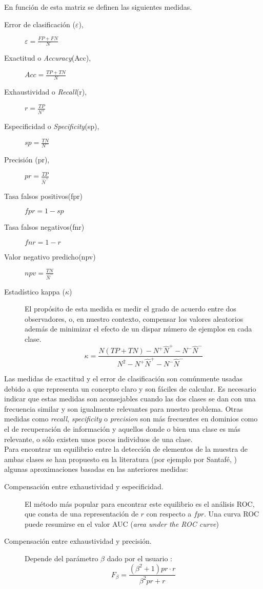 En función de esta matriz se definen las siguientes
medidas.
	
\begin{description}
	\item[Error de clasificación ($\varepsilon$),] 
		$\varepsilon = \frac{FP+FN}{N}$
	\item[Exactitud o \textit{Accuracy}(Acc),] 
		$Acc=\frac{TP+TN}{N}$
	\item[Exhaustividad o \textit{Recall}(r),] $r=\frac{TP}{N^+}$
	\item[Especificidad o \textit{Specificity}(sp),] 
		$sp=\frac{TN}{N^-}$
	\item[Precisión (pr),] 
		$pr=\frac{TP}{\hat{N}^+}$
	\item[Tasa falsos positivos(fpr)] $fpr=1-sp$
	\item[Tasa falsos negativos(fnr)] $fnr=1-r$
	\item[Valor negativo predicho(npv)] 
		$npv=\frac{TN}{\hat{N}^-}$
	\item[Estadístico kappa ($\kappa$)] El propósito de esta 
		medida es medir el grado de acuerdo entre dos 
		observadores, o, en nuestro contexto, compensar los 
		valores aleatorios además de minimizar el efecto de 
		un dispar número de ejemplos en cada clase. 
	\[ 
	\kappa = \frac{N(TP + TN) - N^+\hat{N}^+ - N^-\hat{N}^- }
				  {N^2 - N^+\hat{N}^+ - N^-\hat{N}^- }
	\]
\end{description}
	
	Las medidas de exactitud y el error de 
clasificación son comúnmente usadas debido a que representa 
un concepto claro y son fáciles de calcular.  Es necesario 
indicar que estas medidas son aconsejables cuando las dos 
clases se dan con una frecuencia similar y son igualmente 
relevantes para nuestro problema. Otras medidas como 
\textit{recall}, \textit{specificity} o \textit{precision} 
son más frecuentes en dominios como el de recuperación de 
información y aquellos donde o bien una clase es más 
relevante, o sólo existen unos pocos individuos de 
una clase.\\
	Para encontrar un equilibrio entre la detección de 
elementos de la muestra de ambas clases se han propuesto en 
la literatura (por ejemplo por Santafé, 
\cite{DBLP:journals/air/SantafeIL15}) algunas aproximaciones 
basadas en las anteriores medidas:
	
	\begin{description}
		\item[Compensación entre exhaustividad y 
especificidad.] El método más popular para encontrar 
este equilibrio es el análisis ROC, que consta de una 
representación de $r$ con respecto a $fpr$. Una curva ROC 
puede resumirse en el valor AUC (\textit{area under the ROC 
curve})
		\item[Compensación entre exhaustividad y 
precisión.] Depende del parámetro $\beta$ dado por el 
usuario :
		\[ F_\beta = \frac{(\beta^2+1) pr \cdot r}
						  {\beta^2 pr + r}	\]
	\end{description}

